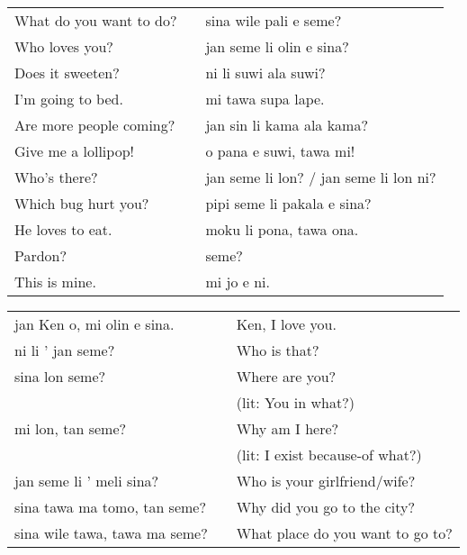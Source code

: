 \begin{supertabular}{p{5,5cm}|ll}
    What do you want to do? &  & sina wile pali e seme?                 \\ %
    Who loves you?          &  & jan seme li olin e sina?               \\ %
    Does it sweeten?        &  & ni li suwi ala suwi?                   \\ %
    I'm going to bed.       &  & mi tawa supa lape.                     \\ %
    Are more people coming? &  & jan sin li kama ala kama?              \\ %
    Give me a lollipop!     &  & o pana e suwi, tawa mi!                \\ %
    Who's there?            &  & jan seme li lon? / jan seme li lon ni? \\ %
    Which bug hurt you?     &  & pipi seme li pakala e sina?            \\ %
    He loves to eat.        &  & moku li pona, tawa ona.                \\ %
    Pardon?                 &  & seme?                                  \\ %
    This is mine.           &  & mi jo e ni.                            \\ %
\end{supertabular}

\begin{supertabular}{p{5,5cm}|ll}
    jan Ken o, mi olin e sina.    &  & Ken, I love you.                 \\
    ni li ' jan seme?             &  & Who is that?                     \\
    sina lon seme?                &  & Where are you?                   \\
                                  &  & (lit: You in what?)              \\ %
    mi lon, tan seme?             &  & Why am I here?                   \\
                                  &  & (lit: I exist because-of what?)  \\ %
    jan seme li ' meli sina?      &  & Who is your girlfriend/wife?     \\
    sina tawa ma tomo, tan seme?  &  & Why did you go to the city?      \\
    sina wile tawa, tawa ma seme? &  & What place do you want to go to? \\
\end{supertabular}

